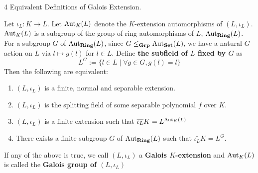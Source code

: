\documentclass[../book.tex]{subfiles}
\begin{document}
\begin{dfn} 4 Equivalent Definitions of Galois Extension. 
    
    Let $\iota_L : K \to L$. 
    Let $\text{Aut}_{K}(L)$ denote the $K$-extension automorphisms of $(L,\iota_L)$. 
    $\text{Aut}_{K}(L)$ is a subgroup of 
    the group of ring automorphisms of $L$, $\text{Aut}_{\mathbf{Ring}}(L)$. 
    For a subgroup $G$ of $\text{Aut}_{\mathbf{Ring}}(L)$, 
    since $G \leq_{\mathbf{Grp}} \text{Aut}_{\mathbf{Set}}(L)$, 
    we have a natural $G$ action on $L$ via $l \mapsto g(l)$ for $l \in L$. 
    Define \textbf{the subfield of $L$ fixed by $G$} as
    \[ L^G := \{l \in L \mid \forall g \in G, g(l)=l\} \]
    Then the following are equivalent: 
    \begin{enumerate}
        \item $(L,\iota_L)$ is a finite, normal and separable extension.
        \item $(L,\iota_L)$ is the splitting field 
            of some separable polynomial $f$ over $K$.
        \item $(L,\iota_L)$ is a finite extension such that $\overline{\iota_L}K = L^{\text{Aut}_{K}(L)}$
        \item There exists a finite subgroup $G$ of $\text{Aut}_{\mathbf{Ring}}(L)$ such that $\bar{\iota_L} K = L^G$.
    \end{enumerate}
    If any of the above is true,
    we call $(L,\iota_L)$ a \textbf{Galois $K$-extension}
    and $\text{Aut}_{K}(L)$ is called the \textbf{Galois group of $(L,\iota_L)$} 
\end{dfn}
\end{document}
